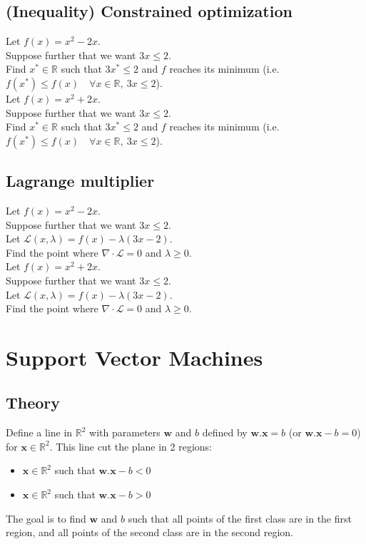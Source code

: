 \documentclass[]{article}
\newcommand{\R}{\mathbb{R}}
\begin{document}
	\subsection{(Inequality) Constrained optimization}
	Let $f(x) = x^2-2x$.\\
	Suppose further that we want $3x \leq 2$.\\
	Find $x^* \in \R$ such that $3x^* \leq 2$ and $f$ reaches its minimum (i.e. $f(x^*) \leq f(x) \quad \forall x \in \R,\ 3x \leq 2$).
	\vspace{0.5cm}
	\\
	Let $f(x) = x^2+2x$.\\
	Suppose further that we want $3x \leq 2$.\\
	Find $x^* \in \R$ such that $3x^* \leq 2$ and $f$ reaches its minimum (i.e. $f(x^*) \leq f(x) \quad \forall x \in \R,\ 3x \leq 2$).
	
	\subsection{Lagrange multiplier}
	Let $f(x) = x^2-2x$.\\
	Suppose further that we want $3x \leq 2$.\\
	Let $\mathcal{L}(x,\lambda) = f(x) - \lambda (3x - 2)$.\\
	Find the point where $\nabla \cdot \mathcal{L} = 0$ and $\lambda \geq 0$.
	\vspace{0.5cm}
	\\
	Let $f(x) = x^2+2x$.\\
	Suppose further that we want $3x \leq 2$.\\
	Let $\mathcal{L}(x,\lambda) = f(x) - \lambda (3x - 2)$.\\
	Find the point where $\nabla \cdot \mathcal{L} = 0$ and $\lambda \geq 0$.
	
	
	
	
	
	
	\section{Support Vector Machines}
	\subsection{Theory}
	Define a line in $\R^2$ with parameters $\mathbf{w}$ and $b$ defined by $\mathbf{w}.\mathbf{x} = b$ (or $\mathbf{w}.\mathbf{x} - b = 0$) for $\mathbf{x} \in \R^2$.
	This line cut the plane in 2 regions:
	\begin{itemize}
		\item $\mathbf{x} \in \R^2$ such that $\mathbf{w}.\mathbf{x} - b < 0$
		\item $\mathbf{x} \in \R^2$ such that $\mathbf{w}.\mathbf{x} - b > 0$
	\end{itemize}
	The goal is to find $\mathbf{w}$ and $b$ such that all points of the first class are in the first region, and all points of the second class are in the second region.
	
\end{document}
